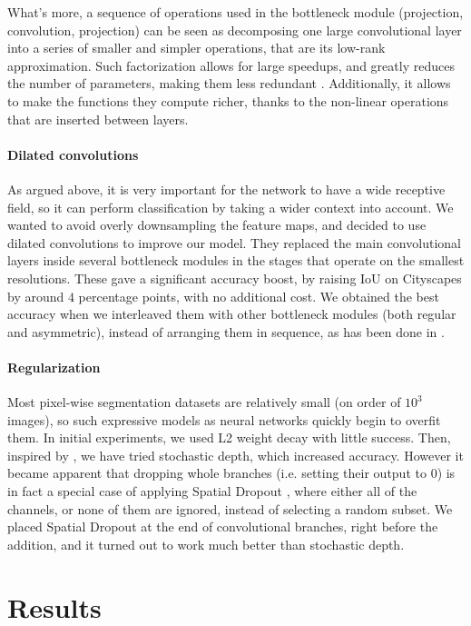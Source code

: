 \documentclass{article}
\begin{document}
What's more, a sequence of operations used in the bottleneck module (projection, convolution, projection) can be seen as decomposing one large convolutional layer into a series of smaller and simpler operations, that are its low-rank approximation.
Such factorization allows for large speedups, and greatly reduces the number of parameters, making them less redundant \cite{jin2014flattened}.
Additionally, it allows to make the functions they compute richer, thanks to the non-linear operations that are inserted between layers.

\paragraph{Dilated convolutions}
As argued above, it is very important for the network to have a wide receptive field, so it can perform classification by taking a wider context into account.
We wanted to avoid overly downsampling the feature maps, and decided to use dilated convolutions \cite{yu2015dilated} to improve our model.
They replaced the main convolutional layers inside several bottleneck modules in the stages that operate on the smallest resolutions.
These gave a significant accuracy boost, by raising IoU on Cityscapes by around $4$ percentage points, with no additional cost.
We obtained the best accuracy when we interleaved them with other bottleneck modules (both regular and asymmetric), instead of arranging them in sequence, as has been done in \cite{yu2015dilated}.

\paragraph{Regularization}
Most pixel-wise segmentation datasets are relatively small (on order of $10^3$ images), so such expressive models as neural networks quickly begin to overfit them.
In initial experiments, we used L2 weight decay with little success.
Then, inspired by \cite{huang2016stochastic}, we have tried stochastic depth, which increased accuracy.
However it became apparent that dropping whole branches (i.e. setting their output to $0$) is in fact a special case of applying Spatial Dropout \cite{tompson15}, where either all of the channels, or none of them are ignored, instead of selecting a random subset.
We placed Spatial Dropout at the end of convolutional branches, right before the addition, and it turned out to work much better than stochastic depth.

\section{Results} \label{results}
\end{document}
